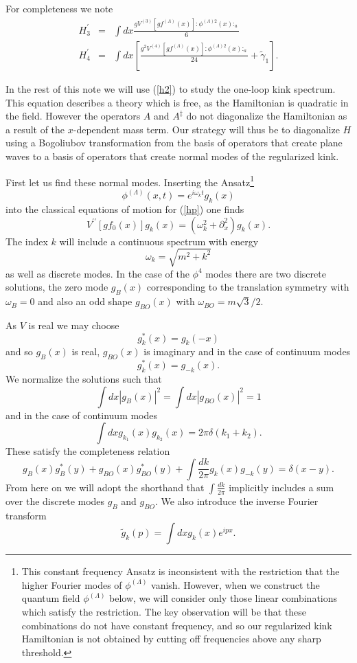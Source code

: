 \def\letter{0}\def\pr{0}\documentclass[a4paper,12pt, epsfig]{article}
\renewcommand{\(}{\begin{equation}}
\renewcommand{\)}{end{equation} \vspace{-.05in}\linebreak}
\renewcommand{\=}{\hspace{-.03in}=\hspace{-.02in}}
\renewcommand{\(}{\begin{equation}}
\renewcommand{\)}{\end{equation}}
\newcommand{\p}{^\prime}
\newcommand{\pp}{^{\prime\prime}}
\renewcommand{\(}{\begin{equation}}
\renewcommand{\)}{\end{equation}}
\def\pin#1{\int \frac{d#1}{2\pi}}
\renewcommand{\L}{{(\Lambda)}}
\newcommand{\beq}{\begin{equation}}
\newcommand{\eeq}{\end{equation}}
\newcommand{\bea}{\begin{eqnarray}}
\newcommand{\eea}{\end{eqnarray}}
\begin{document}
For completeness we note 
%
\bea
H\p_3&=&\int dx\frac{gV^{(3)}[g f^\L(x)]:\phi^{\L 2}(x):_a}{6}\\
H\p_4&=&\int dx\left[\frac{g^2V^{(4)}[g f^\L(x)]:\phi^{\L 2}(x):_a}{24}+\tilde{\gamma}_1\right].\nonumber
\eea


In the rest of this note we will use (\ref{h2}) to study the one-loop kink spectrum.  This equation describes a theory which is free, as the Hamiltonian is quadratic in the field.  However the operators $A$ and $A^\ddag$ do not diagonalize the Hamiltonian as a result of the $x$-dependent mass term.  Our strategy will thus be to diagonalize $H$ using a Bogoliubov transformation from the basis of operators that create plane waves to a basis of operators that create normal modes of the regularized kink.

First let us find these normal modes.  Inserting the Ansatz\footnote{This constant frequency Ansatz is inconsistent with the restriction that the higher Fourier modes of $\phi^\L$ vanish.  However, when we construct the quantum field $\phi^\L$ below, we will consider only those linear combinations which satisfy the restriction.  The key observation will be that these combinations do not have constant frequency, and so our regularized kink Hamiltonian is not obtained by cutting off frequencies above any sharp threshold.}
\beq
\phi^\L(x,t)=e^{i\omega_k t}g_k(x)
\eeq
into the classical equations of motion for (\ref{hp}) one finds
\beq
V\pp[gf_0(x)]g_k(x)=(\omega_k^2+\partial_x^2)g_k(x). \label{fluceqn}
\eeq
The index $k$ will include a continuous spectrum with energy
\beq
\omega_k=\sqrt{m^2+k^2}
\eeq
as well as discrete modes.  In the case of the $\phi^4$ modes there are two discrete solutions, the zero mode $g_B(x)$ corresponding to the translation symmetry with $\omega_B=0$ and also an odd shape $g_{BO}(x)$ with $\omega_{BO}=m\sqrt{3}/2$.

As $V$ is real we may choose
\beq
g^*_k(x)=g_k(-x)
\eeq
and so $g_B(x)$ is real, $g_{BO}(x)$ is imaginary and in the case of continuum modes
\beq
g^*_k(x)=g_{-k}(x).
\eeq
We normalize the solutions such that
\beq
\int dx |g_B(x)|^2=\int dx |g_{BO}(x)|^2=1
\eeq
and in the case of continuum modes
\beq
\int dx g_{k_1}(x) g_{k_2}(x)=2\pi\delta(k_1+k_2).
\eeq
These satisfy the completeness relation
\beq
g_B(x)g^*_B(y)+g_{BO}(x)g^*_{BO}(y)+\pin{k}g_k(x)g_{-k}(y)=\delta(x-y). \label{comp}
\eeq
From here on we will adopt the shorthand that $\pin{k}$ implicitly includes a sum over the discrete modes $g_B$ and $g_{BO}$.  We also introduce the inverse Fourier transform
\beq
\tilde{g}_k(p)=\int dx g_k(x) e^{ipx}.
\eeq
\end{document}
